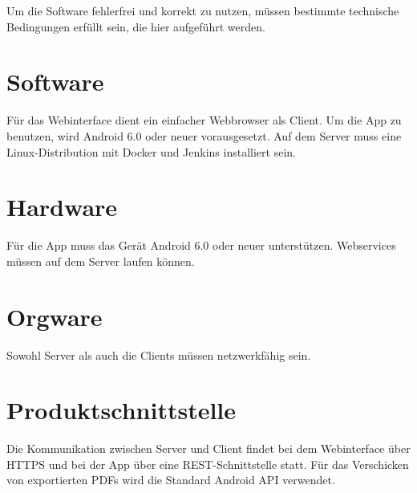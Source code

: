 Um die Software fehlerfrei und korrekt zu nutzen, müssen bestimmte technische Bedingungen erfüllt sein, die hier aufgeführt werden.

\section{Software}

Für das Webinterface dient ein einfacher Webbrowser als Client.
Um die App zu benutzen, wird Android 6.0 oder neuer vorausgesetzt.
\newline
\newline
Auf dem Server muss eine Linux-Distribution mit Docker und Jenkins installiert sein.

\section{Hardware}

Für die App muss das Gerät Android 6.0 oder neuer unterstützen.
\newline
\newline
Webservices müssen auf dem Server laufen können.


\section{Orgware}

Sowohl Server als auch die Clients müssen netzwerkfähig sein.


\section{Produktschnittstelle}

Die Kommunikation zwischen Server und Client findet bei dem Webinterface über HTTPS und bei der App über eine REST-Schnittstelle statt. Für das Verschicken von exportierten PDFs wird die Standard Android API verwendet.